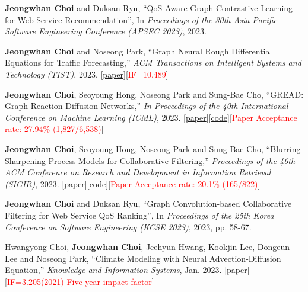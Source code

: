 \documentclass[10pt]{article}
\newenvironment{changemargin}[2]{
  \begin{list}{}{
    \setlength{\topsep}{0pt}
    \setlength{\leftmargin}{#1}
    \setlength{\rightmargin}{#2}
    \setlength{\listparindent}{\parindent}
    \setlength{\itemindent}{\parindent}
    \setlength{\parsep}{\parskip}
  }
  \item[]}{\end{list}
}
\newcommand{\presentation}[2]{
	{#1} \hfill \emph{#2}\\ \bigskip
}
\newcommand{\RED}[1]{\textcolor{red}{#1}}
\newenvironment{body} {
	\vspace*{-16pt}
	\begin{changemargin}{-0.25in}{-0.5in}
  }
	{\end{changemargin}
}
\begin{document}
\begin{body}
	\vspace{14pt}
\presentation{
\textbf{Jeongwhan Choi} and Duksan Ryu, ``QoS-Aware Graph Contrastive Learning for Web Service Recommendation'', In \emph{Proceedings of the 30th Asia-Pacific Software Engineering Conference (APSEC 2023)}, 2023.}{}
\presentation{
\textbf{Jeongwhan Choi} and Noseong Park, ``Graph Neural Rough Differential Equations for Traffic Forecasting,'' \emph{ACM Transactions on Intelligent Systems and Technology (TIST)}, 2023. [\href{https://dl.acm.org/doi/abs/10.1145/3604808}{paper}][\RED{IF=10.489}]}{}
\presentation{
\textbf{Jeongwhan Choi}, Seoyoung Hong, Noseong Park and Sung-Bae Cho, ``GREAD: Graph Reaction-Diffusion Networks,'' \emph{In Proceedings of the 40th International Conference on Machine Learning (ICML)}, 2023. [\href{http://proceedings.mlr.press/v202/choi23a}{paper}][\href{https://github.com/jeongwhanchoi/GREAD}{code}][\RED{Paper Acceptance rate: 27.94\% (1,827/6,538)}]}{}
\presentation{
\textbf{Jeongwhan Choi}, Seoyoung Hong, Noseong Park and Sung-Bae Cho, ``Blurring-Sharpening Process Models for Collaborative Filtering,'' \emph{Proceedings of the 46th ACM Conference on Research and Development in Information Retrieval (SIGIR)}, 2023. [\href{https://arxiv.org/abs/2211.09324}{paper}][\href{https://github.com/jeongwhanchoi/bspm}{code}][\RED{Paper Acceptance rate: 20.1\% (165/822)}]}{}
\presentation{
\textbf{Jeongwhan Choi} and Duksan Ryu, ``Graph Convolution-based Collaborative Filtering for Web Service QoS Ranking'', In \emph{Proceedings of the 25th Korea Conference on Software Engineering (KCSE 2023)}, 2023, pp. 58-67.}{}
\presentation{
Hwangyong Choi, \textbf{Jeongwhan Choi}, Jeehyun Hwang, Kookjin Lee, Dongeun Lee and Noseong Park, ``Climate Modeling with Neural Advection-Diffusion Equation,'' \emph{Knowledge and Information Systems}, Jan. 2023. [\href{https://doi.org/10.1007/s10115-023-01829-2}{paper}] [\RED{IF=3.205(2021) Five year impact factor}]}{}


\end{body}
\end{document}
